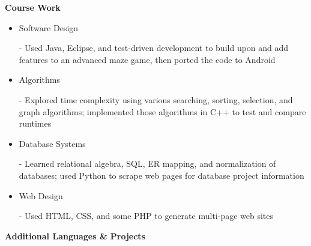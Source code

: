 \documentclass[11pt]{article}
\begin{document}
\begin{LARGE}
	\bf Course Work
\end{LARGE}

\vspace{-0.5em}

\begin{itemize}
	\item \begin{large}\begin{bf}Software Design\end{bf}\end{large} - Used Java, Eclipse, and test-driven development to build upon and add features to an advanced maze game, then ported the code to Android
	\vspace{-0.5em}
	\item \begin{large}\begin{bf}Algorithms\end{bf}\end{large} - Explored time complexity using various searching, sorting, selection, and graph algorithms; implemented those algorithms in C++ to test and compare runtimes
	\vspace{-0.5em}
	\item \begin{large}\begin{bf}Database Systems\end{bf}\end{large} - Learned relational algebra, SQL, ER mapping, and normalization of databases; used Python to scrape web pages for database project information
	\vspace{-0.5em}
	\item \begin{large}\begin{bf}Web Design\end{bf}\end{large} - Used HTML, CSS, and some PHP to generate multi-page web sites
\end{itemize}

\vspace{-0.3em}

\begin{LARGE}
	\bf Additional Languages \& Projects
\end{LARGE}

\vspace{-0.5em}
\end{document}

